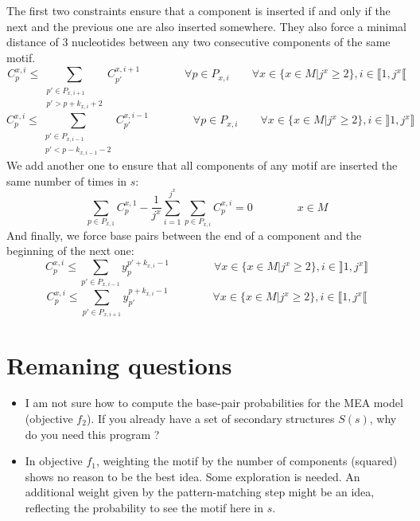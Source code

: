 \documentclass{article}
\begin{document}
The first two constraints ensure that a component is inserted if and only if the next and the previous one are also inserted somewhere.
They also force a minimal distance of 3 nucleotides between any two consecutive components of the same motif.
\begin{equation}\label{constraint:6}
	C^{x,i}_p \leq \sum_{\substack{p' \in P_{x,i+1}\\ p'>p+k_{x,i}+2}} C^{x,i+1}_{p'}	
	\qquad \qquad \forall p \in P_{x,i} \qquad \forall x \in \{ x\in M | j^x \geq 2\}, i \in \llbracket 1,j^x \llbracket
\end{equation}
\begin{equation}\label{constraint:7}
	C^{x,i}_p \leq \sum_{\substack{p' \in P_{x,i-1}\\ p'<p-k_{x,i-1}-2}} C^{x,i-1}_{p'}	
	\qquad \qquad \forall p \in P_{x,i} \qquad \forall x \in \{ x\in M | j^x \geq 2\}, i \in \rrbracket 1,j^x \rrbracket
\end{equation}
We add another one to ensure that all components of any motif are inserted the same number of times in $s$:
\begin{equation}\label{constraint:8}
	\sum_{p\in P_{x,1}} C^{x,1}_p - \frac{1}{j^x} \sum_{i=1}^{j^x} \sum_{p\in P_{x,i}} C^{x,i}_p = 0  \qquad \qquad x\in M
\end{equation}
And finally, we force base pairs between the end of a component and the beginning of the next one:
\begin{equation}\label{constraint:9}
	C^{x,i}_p \leq \sum_{p' \in P_{x,i-1}} y^{p'+k_{x,i}-1}_p \qquad \qquad \forall x \in \{ x\in M | j^x \geq 2\}, i \in \rrbracket 1,j^x \rrbracket
\end{equation}
\begin{equation}\label{constraint:10}
	C^{x,i}_p \leq \sum_{p' \in P_{x,i+1}} y^{p+k_{x,i}-1}_{p'} \qquad \qquad \forall x \in \{ x\in M | j^x \geq 2\}, i \in \llbracket 1,j^x \llbracket
\end{equation}

\section{Remaning questions}
	\begin{itemize}
		\item I am not sure how to compute the base-pair probabilities for the MEA model (objective $f_2$). 
		If you already have a set of secondary structures $S(s)$, why do you need this program ?
		\item In objective $f_1$, weighting the motif by the number of components (squared) shows no reason to be the best idea. 
		Some exploration is needed. An additional weight given by the pattern-matching step might be an idea, reflecting the probability to see the motif here in $s$.
		
	\end{itemize}
	


\end{document}
